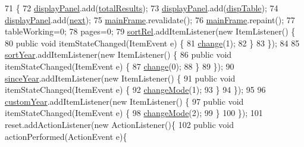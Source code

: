 \begin{DoxyCode}
71                             \{
72         \hyperlink{classGUIQuery_a8b4dbf257e0859c597591f072349b75c}{displayPanel}.add(\hyperlink{classGuiQuery1_a515a1ac46f1362d811dd6e0c27d842fc}{totalResults});
73         \hyperlink{classGUIQuery_a8b4dbf257e0859c597591f072349b75c}{displayPanel}.add(\hyperlink{classGuiQuery1_aaa4f69c2faaffb0b451f1fa5bfebc4d3}{dispTable});
74         \hyperlink{classGUIQuery_a8b4dbf257e0859c597591f072349b75c}{displayPanel}.add(\hyperlink{classGuiQuery1_a0ef1bc892139ef28ea2e6c464f78e881}{next});
75         \hyperlink{classGUIQuery_aba988b5bec899d53480a472de7b87dfa}{mainFrame}.revalidate();
76         \hyperlink{classGUIQuery_aba988b5bec899d53480a472de7b87dfa}{mainFrame}.repaint();
77         tableWorking=0;
78         pages=0;
79         \hyperlink{classGuiQuery1Title_aff3f4abd05828888c376d91e9c72ae3f}{sortRel}.addItemListener(\textcolor{keyword}{new} ItemListener() \{
80              \textcolor{keyword}{public} \textcolor{keywordtype}{void} itemStateChanged(ItemEvent e) \{         
81                         \hyperlink{classGuiQuery1_abe08121cbcebdc066aaec8400bc73cc7}{change}(1);    
82                 \}           
83           \});
84         
85         \hyperlink{classGuiQuery1Title_a282ba6983218ab020c0fe9b65a0c5619}{sortYear}.addItemListener(\textcolor{keyword}{new} ItemListener() \{
86              \textcolor{keyword}{public} \textcolor{keywordtype}{void} itemStateChanged(ItemEvent e) \{         
87                 \hyperlink{classGuiQuery1_abe08121cbcebdc066aaec8400bc73cc7}{change}(0);
88              \}           
89           \});
90         \hyperlink{classGuiQuery1Title_a57f5240e22a35a95739062b91bdd4cba}{sinceYear}.addItemListener(\textcolor{keyword}{new} ItemListener() \{
91              \textcolor{keyword}{public} \textcolor{keywordtype}{void} itemStateChanged(ItemEvent e) \{         
92                         \hyperlink{classGuiQuery1_aa78daa5f76f85f27e3bbde79748bd34d}{changeMode}(1);    
93                 \}           
94           \});
95         
96         \hyperlink{classGuiQuery1Title_aa7c8f24ee5498bd7808133f52a585449}{customYear}.addItemListener(\textcolor{keyword}{new} ItemListener() \{
97              \textcolor{keyword}{public} \textcolor{keywordtype}{void} itemStateChanged(ItemEvent e) \{         
98                 \hyperlink{classGuiQuery1_aa78daa5f76f85f27e3bbde79748bd34d}{changeMode}(2);
99              \}           
100           \});
101         reset.addActionListener(\textcolor{keyword}{new} ActionListener()\{
102                 \textcolor{keyword}{public} \textcolor{keywordtype}{void} actionPerformed(ActionEvent e)\{

\end{DoxyCode}
